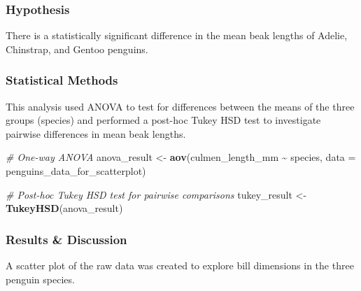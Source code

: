 \documentclass[
]{article}
\newenvironment{Shaded}{\begin{snugshade}}{\end{snugshade}}
\newcommand{\AttributeTok}[1]{\textcolor[rgb]{0.13,0.29,0.53}{#1}}
\newcommand{\CommentTok}[1]{\textcolor[rgb]{0.56,0.35,0.01}{\textit{#1}}}
\newcommand{\FunctionTok}[1]{\textcolor[rgb]{0.13,0.29,0.53}{\textbf{#1}}}
\newcommand{\NormalTok}[1]{#1}
\newcommand{\OtherTok}[1]{\textcolor[rgb]{0.56,0.35,0.01}{#1}}
\newcommand{\SpecialCharTok}[1]{\textcolor[rgb]{0.81,0.36,0.00}{\textbf{#1}}}
\begin{document}
\subsubsection{Hypothesis}\label{hypothesis}

There is a statistically significant difference in the mean beak lengths
of Adelie, Chinstrap, and Gentoo penguins.

\subsubsection{Statistical Methods}\label{statistical-methods}

This analysis used ANOVA to test for differences between the means of
the three groups (species) and performed a post-hoc Tukey HSD test to
investigate pairwise differences in mean beak lengths.

\begin{Shaded}
\begin{Highlighting}[]
\CommentTok{\# One{-}way ANOVA}
\NormalTok{anova\_result }\OtherTok{\textless{}{-}} \FunctionTok{aov}\NormalTok{(culmen\_length\_mm }\SpecialCharTok{\textasciitilde{}}\NormalTok{ species, }\AttributeTok{data =}\NormalTok{ penguins\_data\_for\_scatterplot)}

\CommentTok{\# Post{-}hoc Tukey HSD test for pairwise comparisons}
\NormalTok{tukey\_result }\OtherTok{\textless{}{-}} \FunctionTok{TukeyHSD}\NormalTok{(anova\_result)}
\end{Highlighting}
\end{Shaded}

\subsubsection{Results \& Discussion}\label{results-discussion}

A scatter plot of the raw data was created to explore bill dimensions in
the three penguin species.
\end{document}
